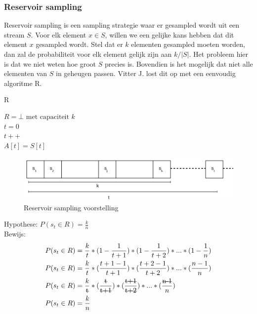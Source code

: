 \subsubsection{Reservoir sampling}
Reservoir sampling is een sampling strategie waar er gesampled wordt uit een stream $S$. Voor elk element $x \in S$, willen we een gelijke kans hebben dat dit element $x$ gesampled wordt. Stel dat er $k$ elementen gesampled moeten worden, dan zal de probabiliteit voor elk element gelijk zijn aan $k/|S|$. Het probleem hier is dat we niet weten hoe groot $S$ precies is. Bovendien is het mogelijk dat niet alle elementen van $S$ in geheugen passen. Vitter J. \cite{reservoir sampling} lost dit op met een eenvoudig algoritme R.

\begin{algorithm}
\caption*{R}
$R = \bot \text{ met capaciteit }k$\\
$t=0$\\
{
$t++$\\
{$A[t]=S[t]$}
}
\end{algorithm}

\newpage
\begin{figure}[htp!]
  \includegraphics[width=\linewidth]{images/reservoir_sampling_voorbeeld.png}
\caption{Reservoir sampling voorstelling}
  \label{fig:reservoir sampling voorbeeld}
\end{figure}

\noindent Hypothese: $P(s_t \in R) = \frac{k}{n}$ \\
Bewijs:
\begin{align*}
P(s_t \in R) &= \frac{k}{t} * (1-\frac{1}{t+1})* (1-\frac{1}{t+2})*...*(1-\frac{1}{n}) 
\\
P(s_t \in R) &= \frac{k}{t} * (\frac{t+1-1}{t+1})* (\frac{t+2-1}{t+2})*...*(\frac{n-1}{n})
\\
P(s_t \in R) &= \frac{k}{\text{\st{t}}} * (\frac{\text{\st{t}}}{\text{\st{t+1}}})* (\frac{\text{\st{t+1}}}{\text{\st{t+2}}})*...*(\frac{\text{\st{n-1}}}{n})\\
P(s_t \in R) &= \frac{k}{n}
\end{align*}

